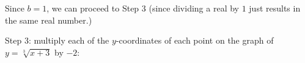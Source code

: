 \documentclass{ximera}
\begin{document}
\begin{example}
\begin{enumerate}








 
 
 Since $b=1$, we can proceed to Step 3 (since dividing a real by $1$ just results in the same real number.)
 
 Step 3:   multiply each of the $y$-coordinates of each point on the graph of $y = \sqrt[3]{x+3}$ by  $-2$:





\end{enumerate}
\end{example}
\end{document}
